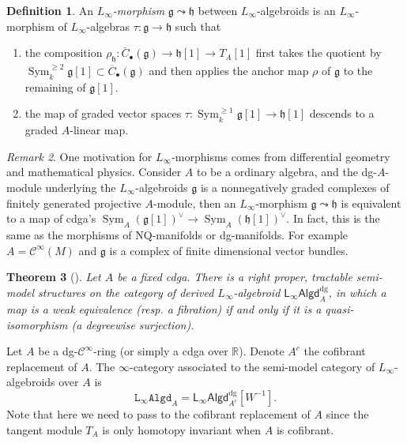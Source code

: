 \documentclass[12pt]{amsart}
\newtheorem{thm}{Theorem}[section]
\theoremstyle{definition}
\newtheorem{defn}[thm]{Definition}
\theoremstyle{remark}
\newtheorem{rem}[thm]{Remark}
\numberwithin{equation}{section}
\newcommand{\cinf}{{\mathcal C}^{\infty}}
\newcommand{\R}{{\mathbb{R}}}
\newcommand{\1}{{\mathbb{1}}}
\newcommand{\g}{\mathfrak{g}}
\newcommand{\h}{\mathfrak{h}}
\newcommand{\lalgd}{\mathsf{L_{\infty}Algd}^{\operatorname{dg}}}
\newcommand{\lalgdi}{\mathtt{L_{\infty}Algd}}
\newcommand{\sym}{\operatorname{Sym}}
\newcommand{\li}{L_{\infty}}
\begin{document}
\begin{defn}
An {\it $L_{\infty}$-morphism} $\g \leadsto \h$ between $L_{\infty}$-algebroids is an $L_{\infty}$-morphism of  $L_{\infty}$-algebras $\tau: \g \to \h$ such that
\begin{enumerate}
    \item the composition $\rho_{\h}: \overline{C}_{\bullet}(\g) \to \h[1] \to T_A[1]$ first takes the quotient by $\sym_k^{\ge 2} \g[1] \subset \overline{C}_{\bullet}(\g)$ and then applies the anchor map $\rho$ of $\g$ to the remaining of $\g[1]$.
    \item the map of graded vector spaces $\tau:\sym_k^{\ge 1}\g[1] \to \h[1]$ descends to a graded $A$-linear map.
\end{enumerate}
\end{defn}
\begin{rem}
    One motivation for $L_{\infty}$-morphisms comes from differential geometry and mathematical physics. Consider $A$ to be a ordinary algebra, and the dg-$A$-module underlying the $L_{\infty}$-algebroids $\g$ is a nonnegatively graded complexes of finitely generated projective $A$-module, then an $L_{\infty}$-morphism $\g \leadsto \h$ is equivalent to a map of cdga's $\sym_A (\g[1])^{\vee} \to \sym_A (\h[1])^{\vee}$. In fact, this is the same as the morphisms of NQ-manifolds or dg-manifolds. For example $A = \cinf{(M)}$ and $\g$ is a complex of finite dimensional vector bundles.
\end{rem}

\begin{thm}[\cite{Nui19}]
Let $A$ be a fixed cdga. There is a 
right proper, tractable semi-model structures on the category of derived $L_{\infty}$-algebroid $\lalgd_A$, in which a map is a weak equivalence (resp. a fibration) if and only if it is a quasi-isomorphism (a degreewise surjection). 
\end{thm}

Let $A$ be a dg-$\cinf$-ring (or simply a cdga over $\R$). Denote $A^c$ the cofibrant replacement of $A$. The $\infty$-category associated to the semi-model category of $\li$-algebroids over $A$ is 
\begin{equation*}
    \lalgdi_A = \lalgd_{A^c}[W^{-1}].
\end{equation*}
Note that here we need to pass to the cofibrant replacement of $A$ since the tangent module $T_A$ is only homotopy invariant when $A$ is cofibrant.

  
\end{document}
